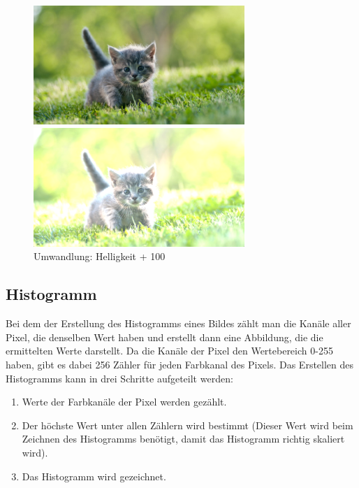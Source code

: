 \documentclass[11pt]{amsart}
\begin{document}
\newpage
\begin{figure}[thb!]
\begin{minipage}{8cm}
\includegraphics[width=8cm]{images/original.jpg}
\end{minipage}
\qquad
\begin{minipage}{8cm}
\includegraphics[width=8cm]{images/myHelligkeit.png}
\end{minipage}
\caption{Umwandlung: Helligkeit + 100}
\label{fig:hellExample}
\end{figure}



\subsection{Histogramm}
Bei dem der Erstellung des Histogramms eines Bildes zählt man die Kanäle aller Pixel, die denselben Wert haben und erstellt dann eine Abbildung, die die ermittelten Werte darstellt. Da die Kanäle der Pixel den Wertebereich 0-255 haben, gibt es dabei 256 Zähler für jeden Farbkanal des Pixels. Das Erstellen des Histogramms kann in drei Schritte aufgeteilt werden:

\begin{enumerate}
\item Werte der Farbkanäle der Pixel werden gezählt.
\item Der höchste Wert unter allen Zählern wird bestimmt (Dieser Wert wird beim Zeichnen des Histogramms benötigt, damit das Histogramm richtig skaliert wird).
\item Das Histogramm wird gezeichnet.
\end{enumerate}
\end{document}
